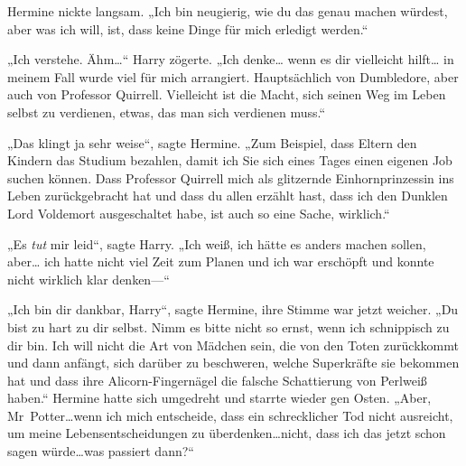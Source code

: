 Hermine nickte langsam. „Ich bin neugierig, wie du das genau machen würdest, aber was ich will, ist, dass keine Dinge für mich erledigt werden.“

„Ich verstehe. Ähm…“ Harry zögerte. „Ich denke… wenn es dir vielleicht hilft… in meinem Fall wurde viel für mich arrangiert. Hauptsächlich von Dumbledore, aber auch von Professor Quirrell. Vielleicht ist die Macht, sich seinen Weg im Leben selbst zu verdienen, etwas, das man sich verdienen muss.“

„Das klingt ja sehr weise“, sagte Hermine. „Zum Beispiel, dass Eltern den Kindern das Studium bezahlen, damit ich Sie sich eines Tages einen eigenen Job suchen können. Dass Professor Quirrell mich als glitzernde Einhornprinzessin ins Leben zurückgebracht hat und dass du allen erzählt hast, dass ich den Dunklen Lord Voldemort ausgeschaltet habe, ist auch so eine Sache, wirklich.“

„Es \emph{tut} mir leid“, sagte Harry. „Ich weiß, ich hätte es anders machen sollen, aber… ich hatte nicht viel Zeit zum Planen und ich war erschöpft und konnte nicht wirklich klar denken—“

„Ich bin dir dankbar, Harry“, sagte Hermine, ihre Stimme war jetzt weicher. „Du bist zu hart zu dir selbst. Nimm es bitte nicht so ernst, wenn ich schnippisch zu dir bin. Ich will nicht die Art von Mädchen sein, die von den Toten zurückkommt und dann anfängt, sich darüber zu beschweren, welche Superkräfte sie bekommen hat und dass ihre Alicorn-Fingernägel die falsche Schattierung von Perlweiß haben.“ Hermine hatte sich umgedreht und starrte wieder gen Osten. „Aber, Mr~Potter…wenn ich mich entscheide, dass ein schrecklicher Tod nicht ausreicht, um meine Lebensentscheidungen zu überdenken…nicht, dass ich das jetzt schon sagen würde…was passiert dann?“

